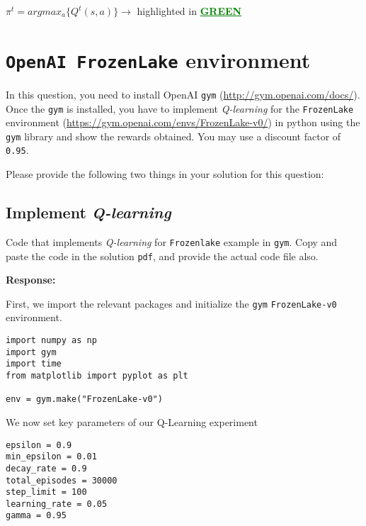 \documentclass[12pt, letterpaper]{article}
\newcommand{\mybox}[1]{\par\noindent\colorbox{shadecolor}
{\parbox{\dimexpr\textwidth-2\fboxsep\relax}{#1}}}
\begin{document}
$\pi^t=argmax_a\{Q^t(s,a)\} \rightarrow$ highlighted in \textcolor{green}{\textbf{\underline{GREEN}}}

\section{\texttt{OpenAI FrozenLake} environment}

\mybox{In this question, you need to install OpenAI \texttt{gym} (\href{http://gym.openai.com/docs/}{http://gym.openai.com/docs/}). 
Once the \texttt{gym} is installed, you have to implement \textit{Q-learning} for the \texttt{FrozenLake} environment (\href{https://gym.openai.com/envs/FrozenLake-v0/}{https://gym.openai.com/envs/FrozenLake-v0/}) in python using the \texttt{gym} library and show the rewards obtained. 
You may use a discount factor of \texttt{0.95}.

Please provide the following two things in your solution for this question:}

\subsection{Implement \textit{Q-learning}}
\mybox{Code that implements \textit{Q-learning} for \texttt{Frozenlake} example in \texttt{gym}. 
Copy and paste the code in the solution \texttt{pdf}, and provide the actual code file also.}

\textbf{Response:}

First, we import the relevant packages and initialize the \texttt{gym} \texttt{FrozenLake-v0} environment.

\begin{mdframed}[backgroundcolor=shadecolor]
\begin{verbatim}
import numpy as np
import gym
import time
from matplotlib import pyplot as plt

env = gym.make("FrozenLake-v0")
\end{verbatim}
\end{mdframed}

We now set key parameters of our Q-Learning experiment

\begin{mdframed}[backgroundcolor=shadecolor]
\begin{verbatim}
epsilon = 0.9
min_epsilon = 0.01
decay_rate = 0.9
total_episodes = 30000
step_limit = 100
learning_rate = 0.05
gamma = 0.95
\end{verbatim}
\end{mdframed}
\end{document}
